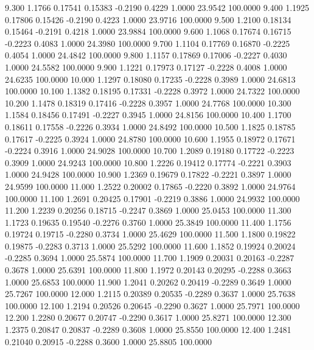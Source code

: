    9.300   1.1766   0.17541   0.15383  -0.2190   0.4229   1.0000  23.9542 100.0000
   9.400   1.1925   0.17806   0.15426  -0.2190   0.4223   1.0000  23.9716 100.0000
   9.500   1.2100   0.18134   0.15464  -0.2191   0.4218   1.0000  23.9884 100.0000
   9.600   1.1068   0.17674   0.16715  -0.2223   0.4083   1.0000  24.3980 100.0000
   9.700   1.1104   0.17769   0.16870  -0.2225   0.4054   1.0000  24.4842 100.0000
   9.800   1.1157   0.17869   0.17006  -0.2227   0.4030   1.0000  24.5582 100.0000
   9.900   1.1221   0.17973   0.17127  -0.2228   0.4008   1.0000  24.6235 100.0000
  10.000   1.1297   0.18080   0.17235  -0.2228   0.3989   1.0000  24.6813 100.0000
  10.100   1.1382   0.18195   0.17331  -0.2228   0.3972   1.0000  24.7322 100.0000
  10.200   1.1478   0.18319   0.17416  -0.2228   0.3957   1.0000  24.7768 100.0000
  10.300   1.1584   0.18456   0.17491  -0.2227   0.3945   1.0000  24.8156 100.0000
  10.400   1.1700   0.18611   0.17558  -0.2226   0.3934   1.0000  24.8492 100.0000
  10.500   1.1825   0.18785   0.17617  -0.2225   0.3924   1.0000  24.8780 100.0000
  10.600   1.1955   0.18972   0.17671  -0.2224   0.3916   1.0000  24.9028 100.0000
  10.700   1.2089   0.19180   0.17722  -0.2223   0.3909   1.0000  24.9243 100.0000
  10.800   1.2226   0.19412   0.17774  -0.2221   0.3903   1.0000  24.9428 100.0000
  10.900   1.2369   0.19679   0.17822  -0.2221   0.3897   1.0000  24.9599 100.0000
  11.000   1.2522   0.20002   0.17865  -0.2220   0.3892   1.0000  24.9764 100.0000
  11.100   1.2691   0.20425   0.17901  -0.2219   0.3886   1.0000  24.9932 100.0000
  11.200   1.2239   0.20256   0.18715  -0.2247   0.3869   1.0000  25.0453 100.0000
  11.300   1.1723   0.19635   0.19540  -0.2276   0.3760   1.0000  25.3849 100.0000
  11.400   1.1756   0.19724   0.19715  -0.2280   0.3734   1.0000  25.4629 100.0000
  11.500   1.1800   0.19822   0.19875  -0.2283   0.3713   1.0000  25.5292 100.0000
  11.600   1.1852   0.19924   0.20024  -0.2285   0.3694   1.0000  25.5874 100.0000
  11.700   1.1909   0.20031   0.20163  -0.2287   0.3678   1.0000  25.6391 100.0000
  11.800   1.1972   0.20143   0.20295  -0.2288   0.3663   1.0000  25.6853 100.0000
  11.900   1.2041   0.20262   0.20419  -0.2289   0.3649   1.0000  25.7267 100.0000
  12.000   1.2115   0.20389   0.20535  -0.2289   0.3637   1.0000  25.7638 100.0000
  12.100   1.2194   0.20526   0.20645  -0.2290   0.3627   1.0000  25.7971 100.0000
  12.200   1.2280   0.20677   0.20747  -0.2290   0.3617   1.0000  25.8271 100.0000
  12.300   1.2375   0.20847   0.20837  -0.2289   0.3608   1.0000  25.8550 100.0000
  12.400   1.2481   0.21040   0.20915  -0.2288   0.3600   1.0000  25.8805 100.0000
